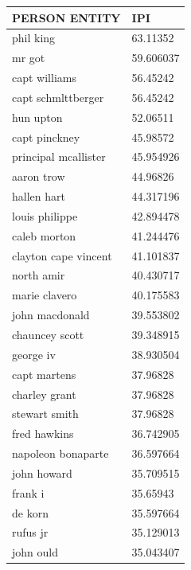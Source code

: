 \documentclass[letterpaper,11pt]{report}
\begin{document}
\begin{table}[h]
\centering
\begin{tabular}{|l|l|}
\hline
\textbf{PERSON ENTITY }             & \textbf{IPI}       \\ \hline
phil king                  & 63.11352  \\ \hline
mr got                     & 59.606037 \\ \hline
capt williams              & 56.45242  \\ \hline
capt schmlttberger         & 56.45242  \\ \hline
hun upton                  & 52.06511  \\ \hline
capt pinckney              & 45.98572  \\ \hline
principal mcallister       & 45.954926 \\ \hline
aaron trow                 & 44.96826  \\ \hline
hallen hart                & 44.317196 \\ \hline
louis philippe             & 42.894478 \\ \hline
caleb morton               & 41.244476 \\ \hline
clayton cape vincent       & 41.101837 \\ \hline
north amir                 & 40.430717 \\ \hline
marie clavero              & 40.175583 \\ \hline
john macdonald             & 39.553802 \\ \hline
chauncey scott             & 39.348915 \\ \hline
george iv                  & 38.930504 \\ \hline
capt martens               & 37.96828  \\ \hline
charley grant              & 37.96828  \\ \hline
stewart smith              & 37.96828  \\ \hline
fred hawkins               & 36.742905 \\ \hline
napoleon bonaparte         & 36.597664 \\ \hline
john howard                & 35.709515 \\ \hline
frank i                    & 35.65943  \\ \hline
de korn                    & 35.597664 \\ \hline
rufus jr                   & 35.129013 \\ \hline
john ould                  & 35.043407 \\ \hline

\end{tabular}
\end{table}
\end{document}

